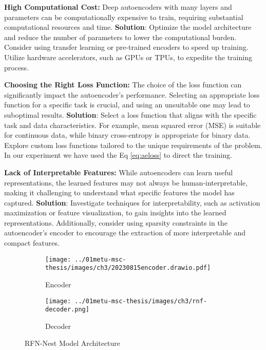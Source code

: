\begin{list}{}{}
    \item \textbf{High Computational Cost:}
    Deep autoencoders with many layers and parameters can be computationally expensive to train, requiring substantial computational resources and time. \textbf{Solution}: Optimize the model architecture and reduce the number of parameters to lower the computational burden. Consider using transfer learning or pre-trained encoders to speed up training. Utilize hardware accelerators, such as GPUs or TPUs, to expedite the training process.
    
    \item \textbf{Choosing the Right Loss Function:}
    The choice of the loss function can significantly impact the autoencoder's performance. Selecting an appropriate loss function for a specific task is crucial, and using an unsuitable one may lead to suboptimal results. \textbf{Solution}: Select a loss function that aligns with the specific task and data characteristics. For example, mean squared error (MSE) is suitable for continuous data, while binary cross-entropy is appropriate for binary data. Explore custom loss functions tailored to the unique requirements of the problem. In our experiment we have used the Eq \ref{eq:aeloss} to direct the training.
    
    \item \textbf{Lack of Interpretable Features:}
    While autoencoders can learn useful representations, the learned features may not always be human-interpretable, making it challenging to understand what specific features the model has captured. \textbf{Solution}: Investigate techniques for interpretability, such as activation maximization or feature visualization, to gain insights into the learned representations. Additionally, consider using sparsity constraints in the autoencoder's encoder to encourage the extraction of more interpretable and compact features.
\end{list}

\begin{figure}[htbp]
    \centering
    \begin{subfigure}[b]{\textwidth}
        \centering
        \texttt{[image: ../01metu-msc-thesis/images/ch3/20230815encoder.drawio.pdf]}
        \caption{Encoder}
        \label{fig:ch3:encoder}
    \end{subfigure}
    \vspace{0.01cm}
    \begin{subfigure}[b]{\textwidth}
        \centering
        \texttt{[image: ../01metu-msc-thesis/images/ch3/rnf-decoder.png]}
        \caption{Decoder}
        \label{fig:ch3:rfnnest:decoder}
    \end{subfigure}
    \caption{RFN-Nest Model Architecture\cite{li2021rfn}}
    \label{fig:ch3:rfnnest}
\end{figure}

